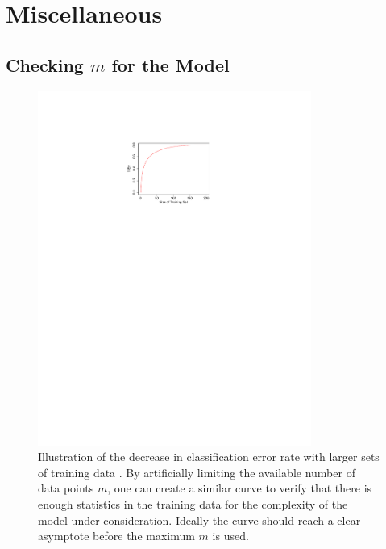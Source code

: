\section{Miscellaneous}
\label{additional:misc}

\subsection{Checking \texorpdfstring{$m$}{m} for the Model}
\label{additional:misc:enough_data}

\begin{figure}
\centering
\includegraphics[width=0.8\textwidth]{figures/ml/acc_vs_m}
\caption{
Illustration of the decrease in classification error rate
with larger sets of training data \cite{HastieTF09}.
By artificially limiting the available number of data points $m$,
one can create a similar curve to verify that
there is enough statistics in the training data
for the complexity of the model under consideration.
Ideally the curve should reach a clear asymptote before the maximum $m$ is used.
}
\label{fig:additional:misc:enough_data}
\end{figure}

